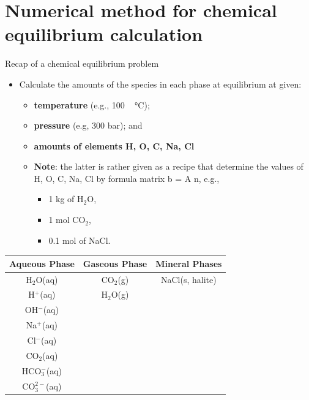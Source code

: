 \section{Numerical method for chemical equilibrium calculation}
%
%
\begin{frame}{Recap of a chemical equilibrium problem}

\lcol
\begin{itemize}
\item Calculate the amounts of the species in each phase at equilibrium
at given:
\begin{itemize}
\item \textbf{temperature} (e.g., 100 ~ °C);
\item \textbf{pressure} (e.g, 300 bar); and 
\item \textbf{amounts of elements H, O, C, Na, Cl} 
\item \textbf{Note}: the latter is rather given as a recipe that determine the values of H, O, C, Na, Cl by formula matrix b = A n, e.g., 
\begin{itemize}
\item 1 kg of H$_{2}$O,
\item 1 mol CO$_{2}$, 
\item 0.1 mol of NaCl.
\end{itemize}
% 

\end{itemize}
\end{itemize}
\rcol
\begin{center}
\begin{table}
\centering
\scriptsize%
\begin{tabular}{ccc}
\toprule 
\multicolumn{1}{c}{\textbf{Aqueous Phase}} & \textbf{Gaseous Phase} & \textbf{Mineral Phases}\tabularnewline
\midrule
H$_{2}$O(aq) & CO$_{2}$(g) & NaCl(s, halite)\tabularnewline
H$^{+}$(aq) & H$_{2}$O(g) & \tabularnewline
OH$^{-}$(aq) &  & \tabularnewline
Na$^{+}$(aq) &  & \tabularnewline
Cl$^{-}$(aq) &  & \tabularnewline
\multicolumn{1}{c}{CO$_{2}$(aq)} &  & \tabularnewline
HCO$_{3}^{-}$(aq) &  & \tabularnewline
\multicolumn{1}{c}{CO$_{3}^{2-}$(aq)} &  & \tabularnewline
\bottomrule
\end{tabular}
\end{table}
\par\end{center}

\ecol
\end{frame}
